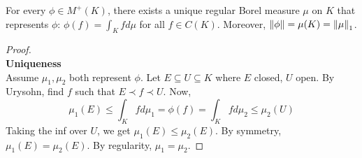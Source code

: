 \documentclass{article}
\begin{document}
\begin{thm}\label{thm:riesz-rep}
  For every $\phi \in M^+(K)$, there exists a unique regular Borel measure $\mu$ on $K$ that represents $\phi$: $\phi(f) = \int_K f d\mu$ for all $f \in C(K)$. Moreover, $\left\lVert \phi\right\rVert = \mu(K) = \left\lVert \mu\right\rVert_1$.
\end{thm}
\begin{proof}~\\
  {\bf Uniqueness} \\
  Assume $\mu_1, \mu_2$ both represent $\phi$. Let $E \subseteq U \subseteq K$ where $E$ closed, $U$ open. By Urysohn, find $f$ such that $E \prec f \prec U$. Now,
  $$\mu_1(E) \le \int_K f d\mu_1 = \phi(f) = \int_K f d\mu_2 \le \mu_2(U)$$
  Taking the inf over $U$, we get $\mu_1(E) \le \mu_2(E)$. By symmetry, $\mu_1(E) = \mu_2(E)$. By regularity, $\mu_1 = \mu_2$.


\end{proof}
\end{document}
